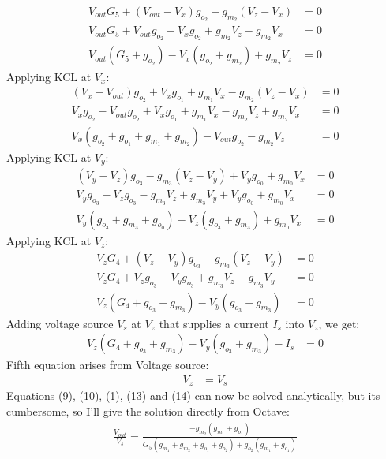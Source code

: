 \begin{enumerate}
\begin{align*}
      V_{out}G_5 + (V_{out} - V_{x})g_{o_2} + g_{m_2}(V_{z} - V_{x}) &= 0 \\
      V_{out}G_5 + V_{out}g_{o_2} - V_{x}g_{o_2} + g_{m_2}V_{z} - g_{m_2}V_{x} &= 0 \\
      V_{out}(G_5 + g_{o_2}) - V_{x}(g_{o_2} + g_{m_2}) + g_{m_2}V_{z} &= 0 \tag{9}
    \end{align*}
    Applying KCL at $V_{x}$:
    \begin{align*}
      (V_{x} - V_{out})g_{o_2} + V_{x}g_{o_1} + g_{m_1}V_{x} - g_{m_2}(V_{z} - V_{x}) &= 0 \\
      V_{x}g_{o_2} - V_{out}g_{o_2} + V_{x}g_{o_1} + g_{m_1}V_{x} - g_{m_2}V_{z} + g_{m_2}V_{x} &= 0 \\
      V_{x}(g_{o_2} + g_{o_1} + g_{m_1} + g_{m_2}) - V_{out}g_{o_2} - g_{m_2}V_{z} &= 0 \tag{10}
    \end{align*}
    Applying KCL at $V_{y}$:
    \begin{align*}
      (V_{y} - V_{z})g_{o_3} - g_{m_3}(V_{z} - V_{y}) + V_{y}g_{o_0} + g_{m_0}V_{x} &= 0 \\
      V_{y}g_{o_3} - V_{z}g_{o_3} - g_{m_3}V_{z} + g_{m_3}V_{y} + V_{y}g_{o_0} + g_{m_0}V_{x} &= 0 \\
      V_{y}(g_{o_3} + g_{m_3} + g_{o_0}) - V_{z}(g_{o_3} + g_{m_3}) + g_{m_0}V_{x} &= 0 \tag{11}
    \end{align*}
    Applying KCL at $V_{z}$:
    \begin{align*}
      V_{z}G_4 + (V_{z} - V_{y})g_{o_3} + g_{m_3}(V_{z} - V_{y}) &= 0 \\
      V_{z}G_4 + V_{z}g_{o_3} - V_{y}g_{o_3} + g_{m_3}V_{z} - g_{m_3}V_{y} &= 0 \\
      V_{z}(G_4 + g_{o_3} + g_{m_3}) - V_{y}(g_{o_3} + g_{m_3}) &= 0 \tag{12}
    \end{align*}
    Adding voltage source $V_s$ at $V_z$ that supplies
    a current $I_s$ into $V_z$, we get:
    \begin{align*}
      V_{z}(G_4 + g_{o_3} + g_{m_3}) - V_{y}(g_{o_3} + g_{m_3}) - I_s &= 0 \tag{13}
    \end{align*}
    Fifth equation arises from Voltage source:
    \begin{align*}
      V_{z} &= V_{s} \tag{14}
    \end{align*}
    Equations (9), (10), (1), (13) and (14) can now be
    solved analytically, but its cumbersome, so I'll give the
    solution directly from Octave:
    \begin{align*}
      \frac{V_{out}}{V_{s}} = \frac{-g_{m_2}(g_{m_1} + g_{o_1})}{G_5(g_{m_1} + g_{m_2} + g_{o_1} + g_{o_2}) + g_{o_2}(g_{m_1} + g_{o_1})} \tag{15}
    \end{align*}
\end{enumerate}


